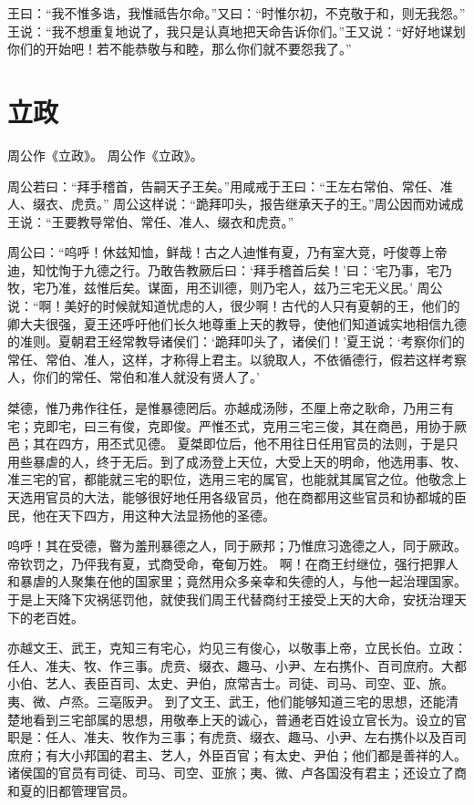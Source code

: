 \documentclass[a4paper,12pt,UTF8,twoside]{ctexbook}
\begin{document}
王曰：“我不惟多诰，我惟祗告尔命。”又曰：“时惟尔初，不克敬于和，则无我怨。”
王说：“我不想重复地说了，我只是认真地把天命告诉你们。”王又说：“好好地谋划你们的开始吧！若不能恭敬与和睦，那么你们就不要怨我了。”

\chapter{立政}

周公作《立政》。
周公作《立政》。

周公若曰：“拜手稽首，告嗣天子王矣。”用咸戒于王曰：“王左右常伯、常任、准人、缀衣、虎贲。”
周公这样说：“跪拜叩头，报告继承天子的王。”周公因而劝诫成王说：“王要教导常伯、常任、准人、缀衣和虎贲。”

周公曰：“呜呼！休兹知恤，鲜哉！古之人迪惟有夏，乃有室大竞，吁俊尊上帝迪，知忱恂于九德之行。乃敢告教厥后曰：‘拜手稽首后矣！’曰：‘宅乃事，宅乃牧，宅乃准，兹惟后矣。谋面，用丕训德，则乃宅人，兹乃三宅无义民。’
周公说：“啊！美好的时候就知道忧虑的人，很少啊！古代的人只有夏朝的王，他们的卿大夫很强，夏王还呼吁他们长久地尊重上天的教导，使他们知道诚实地相信九德的准则。夏朝君王经常教导诸侯们：‘跪拜叩头了，诸侯们！’夏王说：‘考察你们的常任、常伯、准人，这样，才称得上君主。以貌取人，不依循德行，假若这样考察人，你们的常任、常伯和准人就没有贤人了。’

桀德，惟乃弗作往任，是惟暴德罔后。亦越成汤陟，丕厘上帝之耿命，乃用三有宅；克即宅，曰三有俊，克即俊。严惟丕式，克用三宅三俊，其在商邑，用协于厥邑；其在四方，用丕式见德。
夏桀即位后，他不用往日任用官员的法则，于是只用些暴虐的人，终于无后。到了成汤登上天位，大受上天的明命，他选用事、牧、准三宅的官，都能就三宅的职位，选用三宅的属官，也能就其属官之位。他敬念上天选用官员的大法，能够很好地任用各级官员，他在商都用这些官员和协都城的臣民，他在天下四方，用这种大法显扬他的圣德。

呜呼！其在受德，暋为羞刑暴德之人，同于厥邦；乃惟庶习逸德之人，同于厥政。帝钦罚之，乃伻我有夏，式商受命，奄甸万姓。
啊！在商王纣继位，强行把罪人和暴虐的人聚集在他的国家里；竟然用众多亲幸和失德的人，与他一起治理国家。于是上天降下灾祸惩罚他，就使我们周王代替商纣王接受上天的大命，安抚治理天下的老百姓。

亦越文王、武王，克知三有宅心，灼见三有俊心，以敬事上帝，立民长伯。立政：任人、准夫、牧、作三事。虎贲、缀衣、趣马、小尹、左右携仆、百司庶府。大都小伯、艺人、表臣百司、太史、尹伯，庶常吉士。司徒、司马、司空、亚、旅。夷、微、卢烝。三亳阪尹。
到了文王、武王，他们能够知道三宅的思想，还能清楚地看到三宅部属的思想，用敬奉上天的诚心，普通老百姓设立官长为。设立的官职是：任人、准夫、牧作为三事；有虎贲、缀衣、趣马、小尹、左右携仆以及百司庶府；有大小邦国的君主、艺人，外臣百官；有太史、尹伯；他们都是善祥的人。诸侯国的官员有司徒、司马、司空、亚旅；夷、微、卢各国没有君主；还设立了商和夏的旧都管理官员。
\end{document}
